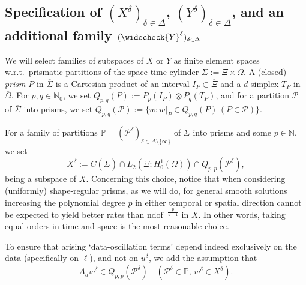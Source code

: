 \documentclass{amsart}
\numberwithin{equation}{section}
\newcommand{\N}{\mathbb N}
\newcommand{\1}{\mathbb 1}
\newcommand{\be}{\begin{equation}}
\newcommand{\ee}{\end{equation}}
\newcommand{\bbP}{\mathbb{P}}
\newcommand{\pria}{{\mathcal P}}
\begin{document}
 \subsection{Specification of $(X^\delta)_{\delta \in \Delta}$, $(Y^\delta)_{\delta \in \Delta}$, and an additional family $(\widecheck{Y}^\delta)_{\delta \in \Delta}$}
We will select families of subspaces of $X$ or $Y$ as finite element spaces w.r.t.~prismatic partitions of the space-time cylinder 
$\Sigma:=\Xi \times \Omega$.
 A (closed) \emph{prism} $P$ in $\overline{\Sigma}$ is a Cartesian product of an interval $I_P \subset \overline{\Xi}$ and a $d$-simplex $T_P$ in $\overline{\Omega}$.
For $p,q \in \N_0$, we set $Q_{p,q}(P):=P_p(I_P)\otimes P_q(T_P)$, and for a partition $\pria$ of $\overline{\Sigma}$ into prisms, we set $Q_{p,q}(\pria):=\{w\colon w|_P \in Q_{p,q}(P)\,(P \in \pria)\}$.

For a family of partitions $\bbP=(\pria^\delta)_{\delta \in \Delta\setminus\{\infty\}}$ of $\overline{\Sigma}$ into prisms and some $p \in \N$, we set
\be \label{eq:105}
X^\delta := C(\overline{\Sigma}) \cap L_2(\Xi;H_0^1(\Omega)) \cap Q_{p,p}(\pria^\delta),
\ee
being a subspace of $X$.
Concerning this choice, notice that when considering (uniformly) shape-regular prisms, as we will do, for general smooth solutions increasing the polynomial degree $p$ in either temporal or spatial direction cannot be expected to yield better rates than $\text{ndof}^{-\frac{p}{d+1}}$ in $X$. In other words, taking equal orders in time and space is the most reasonable choice.

To ensure that arising `data-oscillation terms' depend indeed exclusively on the data (specifically on $\ell$), and not on $u^\delta$, we add the assumption that
\be \label{eq:107}
A_a w^\delta \in Q_{p,p}(\pria^\delta)\quad(\pria^\delta \in \bbP,\,w^\delta \in X^\delta).
\ee
\end{document}
